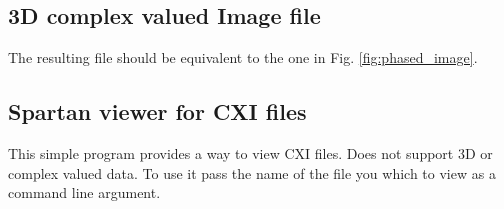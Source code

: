 \documentclass[usletter,11pt]{article}
\begin{document}
\clearpage
\subsection{3D complex valued Image file}

The resulting file should be equivalent to the one in Fig. \ref{fig:phased_image}.

\clearpage
\subsection{Spartan viewer for CXI files}

This simple program provides a way to view CXI files. Does not support
3D or complex valued data. To use it pass the name of the file
you which to view as a command line argument.
\end{document}
